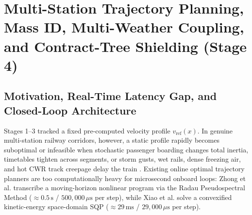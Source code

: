 \documentclass[10pt,a4paper]{article}
\begin{document}
\section{Multi-Station Trajectory Planning, Mass ID, Multi-Weather Coupling, and Contract-Tree Shielding (Stage 4)}
\label{sec:stage4_corridor}

\subsection{Motivation, Real-Time Latency Gap, and Closed-Loop Architecture}
Stages 1--3 tracked a fixed pre-computed velocity profile $v_{\text{ref}}(x)$. In genuine multi-station railway corridors, however, a static profile rapidly becomes suboptimal or infeasible when stochastic passenger boarding changes total inertia, timetables tighten across segments, or storm gusts, wet rails, dense freezing air, and hot CWR track creepage delay the train \cite{ref15, ref16}. Existing online optimal trajectory planners are too computationally heavy for microsecond onboard loops: Zhong et al. \cite{ref15} transcribe a moving-horizon nonlinear program via the Radau Pseudospectral Method ($\approx 0.5\,\text{s}$ / $500,000\,\mu\text{s}$ per step), while Xiao et al. \cite{ref16} solve a convexified kinetic-energy space-domain SQP ($\approx 29\,\text{ms}$ / $29,000\,\mu\text{s}$ per step).
\end{document}
